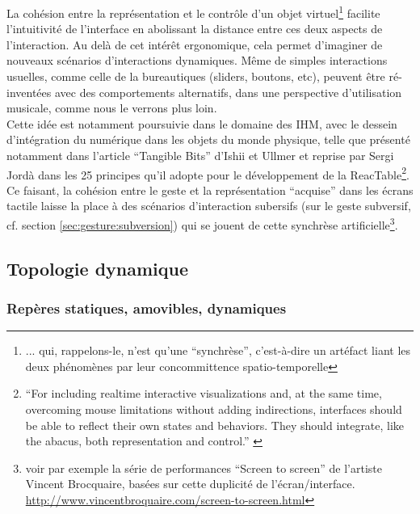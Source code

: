 \noindent La cohésion entre la représentation et le contrôle d'un objet virtuel\footnote{... qui, rappelons-le, n'est qu'une ``synchrèse'', c'est-à-dire un artéfact liant les deux phénomènes par leur concommittence spatio-temporelle} facilite l'intuitivité de l'interface en abolissant la distance entre ces deux aspects de l'interaction. Au delà de cet intérêt ergonomique, cela permet d'imaginer de nouveaux scénarios d'interactions dynamiques. Même de simples interactions usuelles, comme celle de la bureautiques (sliders, boutons, etc), peuvent être ré-inventées avec des comportements alternatifs, dans une perspective d'utilisation musicale, comme nous le verrons plus loin.\\
\indent Cette idée est notamment poursuivie dans le domaine des \gls{IHM}, avec le dessein d'intégration du numérique dans les objets du monde physique, telle que présenté notamment dans l'article ``Tangible Bits'' d'Ishii et Ullmer \cite{ishii_tangible_1997} et reprise par Sergi Jordà dans les 25 principes qu'il adopte pour le développement de la ReacTable\footnote{``For including realtime interactive visualizations and, at the same time, overcoming
mouse limitations without adding indirections, interfaces should be able to reflect their own states and behaviors. They should integrate, like the abacus, both representation and control.'' \cite{jorda_digital_2005}}.\\
\indent Ce faisant, la cohésion entre le geste et la représentation ``acquise'' dans les écrans tactile laisse la place à des scénarios d'interaction subersifs (sur le geste subversif, cf. section \ref{sec:gesture:subversion}) qui se jouent de cette synchrèse artificielle\footnote{voir par exemple la série de performances ``Screen to screen'' de l'artiste Vincent Brocquaire, basées sur cette duplicité de l'écran/interface. \url{http://www.vincentbroquaire.com/screen-to-screen.html}}.\\


\subsection{Topologie dynamique}

\subsubsection{Repères statiques, amovibles, dynamiques}

